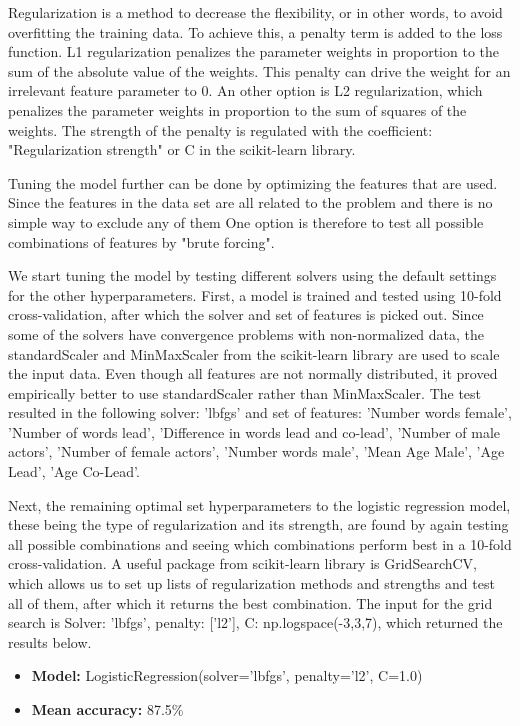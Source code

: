 \documentclass{article}
\begin{document}
\noindent Regularization is a method to decrease the flexibility, or in other words, to avoid overfitting the training data. To achieve this, a penalty term is added to the loss function. L1 regularization penalizes the parameter weights in proportion to the sum of the absolute value of the weights. This penalty can drive the weight for an irrelevant feature parameter to 0. An other option is L2 regularization, which penalizes the parameter weights in proportion to the sum of squares of the weights. The strength of the penalty is regulated with the coefficient: "Regularization strength" or C in the scikit-learn library. 

Tuning the model further can be done by optimizing the features that are used. Since the features in the data set are all related to the problem and there is no simple way to exclude any of them One option is therefore to test all possible combinations of features by "brute forcing". 

We start tuning the model by testing different solvers using the default settings for the other hyperparameters. First, a model is trained and tested using 10-fold cross-validation, after which the solver and set of features is picked out. Since some of the solvers have convergence problems with non-normalized data, the standardScaler and MinMaxScaler from the scikit-learn library are used to scale the input data. Even though all features are not normally distributed, it proved empirically better to use standardScaler rather than MinMaxScaler. The test resulted in the following solver: 'lbfgs' and set of features: 'Number words female', 'Number of words lead', 'Difference in words lead and co-lead', 'Number of male actors', 'Number of female actors', 'Number words male', 'Mean Age Male', 'Age Lead', 'Age Co-Lead'. 

Next, the remaining optimal set hyperparameters to the logistic regression model, these being the type of regularization and its strength, are found by again testing all possible combinations and seeing which combinations perform best in a 10-fold cross-validation. A useful package from scikit-learn library is GridSearchCV,  which allows us to set up lists of regularization methods and strengths and test all of them, after which it returns the best combination. The input for the grid search is Solver: 'lbfgs', penalty: ['l2'], C: np.logspace(-3,3,7), which returned the results below. 

\begin{itemize}
    \item \textbf{Model: }LogisticRegression(solver='lbfgs', penalty='l2', C=1.0)
    \item \textbf{Mean accuracy: } 87.5\%
\end{itemize}
\end{document}
